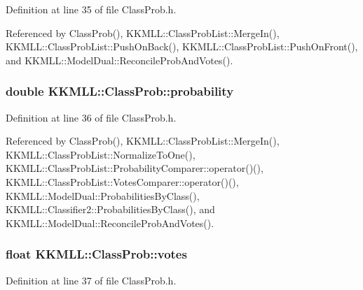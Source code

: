 Definition at line 35 of file Class\+Prob.\+h.



Referenced by Class\+Prob(), K\+K\+M\+L\+L\+::\+Class\+Prob\+List\+::\+Merge\+In(), K\+K\+M\+L\+L\+::\+Class\+Prob\+List\+::\+Push\+On\+Back(), K\+K\+M\+L\+L\+::\+Class\+Prob\+List\+::\+Push\+On\+Front(), and K\+K\+M\+L\+L\+::\+Model\+Dual\+::\+Reconcile\+Prob\+And\+Votes().

\subsubsection[{\texorpdfstring{probability}{probability}}]{\setlength{\rightskip}{0pt plus 5cm}double K\+K\+M\+L\+L\+::\+Class\+Prob\+::probability}\hypertarget{class_k_k_m_l_l_1_1_class_prob_acea1b6e0e6011c4d7d1008a73c6bbc37}{}\label{class_k_k_m_l_l_1_1_class_prob_acea1b6e0e6011c4d7d1008a73c6bbc37}


Definition at line 36 of file Class\+Prob.\+h.



Referenced by Class\+Prob(), K\+K\+M\+L\+L\+::\+Class\+Prob\+List\+::\+Merge\+In(), K\+K\+M\+L\+L\+::\+Class\+Prob\+List\+::\+Normalize\+To\+One(), K\+K\+M\+L\+L\+::\+Class\+Prob\+List\+::\+Probability\+Comparer\+::operator()(), K\+K\+M\+L\+L\+::\+Class\+Prob\+List\+::\+Votes\+Comparer\+::operator()(), K\+K\+M\+L\+L\+::\+Model\+Dual\+::\+Probabilities\+By\+Class(), K\+K\+M\+L\+L\+::\+Classifier2\+::\+Probabilities\+By\+Class(), and K\+K\+M\+L\+L\+::\+Model\+Dual\+::\+Reconcile\+Prob\+And\+Votes().

\subsubsection[{\texorpdfstring{votes}{votes}}]{\setlength{\rightskip}{0pt plus 5cm}float K\+K\+M\+L\+L\+::\+Class\+Prob\+::votes}\hypertarget{class_k_k_m_l_l_1_1_class_prob_a0e0ab2ae02ec4390c60f87c1ab450da8}{}\label{class_k_k_m_l_l_1_1_class_prob_a0e0ab2ae02ec4390c60f87c1ab450da8}


Definition at line 37 of file Class\+Prob.\+h.



